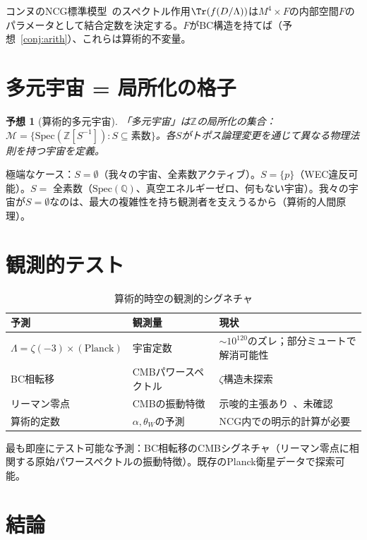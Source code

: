 \documentclass[11pt,a4paper]{article}
\newtheorem{conjecture}[theorem]{予想}
\newcommand{\Spec}{\mathrm{Spec}}
\begin{document}
コンヌのNCG標準模型~\cite{CCM2007}のスペクトル作用$\Tr(f(D/\Lambda))$は$M^4 \times F$の内部空間$F$のパラメータとして結合定数を決定する。$F$がBC構造を持てば（予想~\ref{conj:arith}）、これらは算術的不変量。

\section{多元宇宙 = 局所化の格子}

\begin{conjecture}[算術的多元宇宙]
「多元宇宙」は$\mathbb{Z}$の局所化の集合：$\mathcal{M} = \{\Spec(\mathbb{Z}[S^{-1}]) : S \subseteq \text{素数}\}$。各$S$がトポス論理変更を通じて異なる物理法則を持つ宇宙を定義。
\end{conjecture}

極端なケース：$S = \emptyset$（我々の宇宙、全素数アクティブ）。$S = \{p\}$（WEC違反可能）。$S = $ 全素数（$\Spec(\mathbb{Q})$、真空エネルギーゼロ、何もない宇宙）。我々の宇宙が$S = \emptyset$なのは、最大の複雑性を持ち観測者を支えうるから（算術的人間原理）。

\section{観測的テスト}

\begin{table}[h]
\centering
\caption{算術的時空の観測的シグネチャ}
\small
\begin{tabular}{@{}p{2.5cm}p{3.5cm}p{4cm}@{}}
\toprule
予測 & 観測量 & 現状 \\
\midrule
$\Lambda = \zeta(-3) \times (\text{Planck})$ & 宇宙定数 & $\sim 10^{120}$のズレ；部分ミュートで解消可能性 \\
BC相転移 & CMBパワースペクトル & $\zeta$構造未探索 \\
リーマン零点 & CMBの振動特徴 & 示唆的主張あり~\cite{Wolf2010}、未確認 \\
算術的定数 & $\alpha, \theta_W$の予測 & NCG内での明示的計算が必要 \\
\bottomrule
\end{tabular}
\end{table}

最も即座にテスト可能な予測：BC相転移のCMBシグネチャ（リーマン零点に相関する原始パワースペクトルの振動特徴）。既存のPlanck衛星データで探索可能。

\section{結論}
\end{document}
